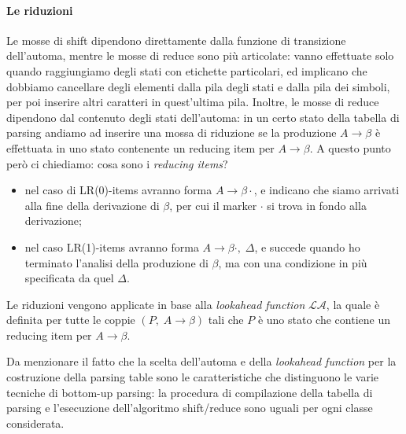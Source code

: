 \documentclass[class=book, crop=false, oneside, 12pt]{standalone}
\begin{document}
\paragraph{Le riduzioni}
Le mosse di shift dipendono direttamente dalla funzione di transizione dell'automa, mentre le mosse di reduce sono più articolate: vanno effettuate solo quando raggiungiamo degli stati con etichette particolari, ed implicano che dobbiamo cancellare degli elementi dalla pila degli stati e dalla pila dei simboli, per poi inserire altri caratteri in quest'ultima pila. Inoltre, le mosse di reduce dipendono dal contenuto degli stati dell'automa: in un certo stato della tabella di parsing andiamo ad inserire una mossa di riduzione se la produzione \(A \to \beta\) è effettuata in uno stato contenente un reducing item per \(A \to \beta\). A questo punto però ci chiediamo: cosa sono i \emph{reducing items}?
\begin{itemize}
    \item nel caso di LR(0)-items avranno forma \(A \to \beta \cdot\), e indicano che siamo arrivati alla fine della derivazione di \(\beta\), per cui il marker \(\cdot\) si trova in fondo alla derivazione;
    \item nel caso LR(1)-items avranno forma \(A \to \beta \cdot, \; \Delta\), e succede quando ho terminato l'analisi della produzione di \(\beta\),  ma con una condizione in più specificata da quel \(\Delta\).
\end{itemize}
Le riduzioni vengono applicate in base alla \emph{lookahead function} \(\mathcal{LA}\), la quale è definita per tutte le coppie \((P,\; A \to \beta)\) tali che \(P\) è uno stato che contiene un reducing item per \(A \to \beta\).

Da menzionare il fatto che la scelta dell'automa e della \emph{lookahead function} per la costruzione della parsing table sono le caratteristiche che distinguono le varie tecniche di bottom-up parsing: la procedura di compilazione della tabella di parsing e l'esecuzione dell'algoritmo shift/reduce sono uguali per ogni classe considerata.
\end{document}
